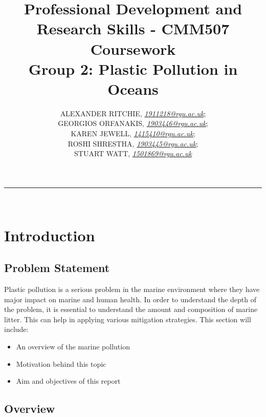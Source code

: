 \documentclass[10pt]{article}\usepackage[]{graphicx}\usepackage[]{color}
\begin{document}
\title{\LARGE Professional Development and Research Skills - CMM507 Coursework  \\ Group 2: Plastic Pollution in Oceans}

\author{ALEXANDER RITCHIE, \textit{\href{1911218@rgu.ac.uk}{1911218@rgu.ac.uk}};\\ GEORGIOS ORFANAKIS, \textit{\href{1903446@rgu.ac.uk}{1903446@rgu.ac.uk}};\\ KAREN JEWELL, \textit{\href{1415410@rgu.ac.uk}{1415410@rgu.ac.uk}};\\ ROSHI SHRESTHA, \textit{\href{1903445@rgu.ac.uk}{1903445@rgu.ac.uk}};\\ STUART WATT, \textit{\href{1501869@rgu.ac.uk}{1501869@rgu.ac.uk}}}

\maketitle
\noindent\rule{16cm}{0.4pt}
\ \\

\section{Introduction}



\subsection{Problem Statement}\label{statement}

Plastic pollution is a serious problem in the marine environment where they have major impact on marine and human health. In order to understand the depth of the problem, it is essential to understand the amount and composition of marine litter. This can help in applying various mitigation strategies. This section will include:
\begin{itemize}
\item An overview of the marine pollution
\item Motivation behind this topic
\item Aim and objectives of this report
\end{itemize}


\subsection{Overview}\label{over}
\end{document}
